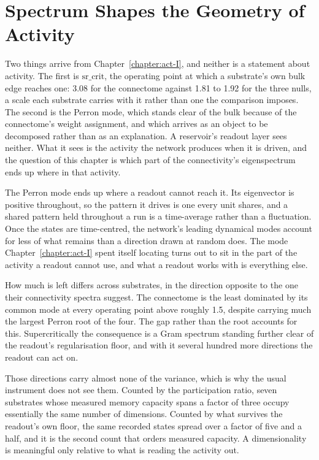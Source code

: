 \chapter{Spectrum Shapes the Geometry of Activity}
\label{chapter:act-II}

Two things arrive from Chapter~\ref{chapter:act-I}, and neither is a
statement about activity. The first is $\mathrm{sr\_crit}$, the operating
point at which a substrate's own bulk edge reaches one:
3.08 %
for the connectome against
1.81 to 1.92 %
for the three nulls, a scale each substrate carries with it rather than one
the comparison imposes. The second is the Perron mode, which stands clear of
the bulk because of the connectome's weight assignment, and which arrives as
an object to be decomposed rather than as an explanation. A reservoir's readout layer 
sees neither. What it sees is the activity the network produces when it is driven,
and the question of this chapter is which part of the connectivity's
eigenspectrum ends up where in that activity.

The Perron mode ends up where a readout cannot reach it. Its eigenvector is
positive throughout, so the pattern it drives is one every unit shares, and a
shared pattern held throughout a run is a time-average rather than a
fluctuation. Once the states are time-centred, the network's leading dynamical
modes account for less of what remains than a direction drawn at random does.
The mode Chapter~\ref{chapter:act-I} spent itself locating turns out to sit in
the part of the activity a readout cannot use, and what a readout works with is
everything else.

How much is left differs across substrates, in the direction opposite to the
one their connectivity spectra suggest. The connectome is the least dominated
by its common mode at every operating point above roughly 1.5, despite carrying
much the largest Perron root of the four. The gap rather than the root accounts
for this. 
Supercritically the consequence is a Gram spectrum standing further clear of
the readout's regularisation floor, and with it several hundred more directions
the readout can act on.

Those directions carry almost none of the variance, which is why the usual
instrument does not see them. Counted by the participation ratio, seven
substrates whose measured memory capacity spans a factor of three occupy
essentially the same number of dimensions. Counted by what survives the
readout's own floor, the same recorded states spread over a factor of five and
a half, and it is the second count that orders measured capacity. A
dimensionality is meaningful only relative to what is reading the activity out.

